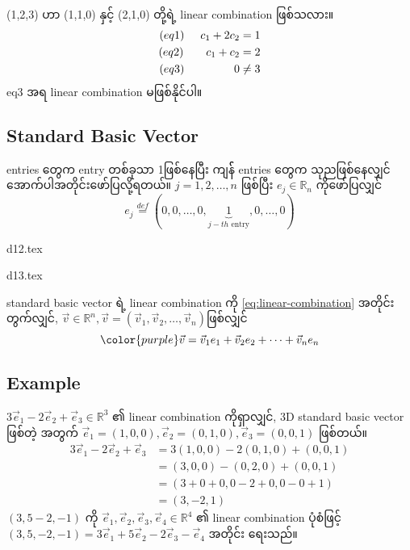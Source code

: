 (1,2,3) ဟာ (1,1,0) နှင့် (2,1,0) တို့ရဲ့ linear combination ဖြစ်သလား။
\[
    \begin{split}
        (eq1)\hspace{5mm}c_1+2c_2 & =1 \\
        (eq2)\hspace{7mm}c_1+c_2     & =2 \\
        (eq3)\hspace{15.5mm}0 & \neq3
    \end{split}
\]
eq3 အရ linear combination မဖြစ်နိုင်ပါ။
\subsection{Standard Basic Vector}
entries တွေက entry တစ်ခုသာ 1ဖြစ်နေပြီး ကျန်် entries တွေက သုညဖြစ်နေလျှင် အောက်ပါအတိုင်းဖော်ပြလို့ရတယ်။ $j=1,2,\dots,n$ ဖြစ်ပြီး $e_j\in\mathbb{R}_n$ ကိုဖော်ပြလျှင်
\begin{equation}
    e_j\stackrel{def}{=}(0,0,\dots,0,\underbrace{1}_{j-th\text{ entry}},0,\dots,0)
\end{equation}
\begin{minipage}{0.45\textwidth}
    \centering
    {d12.tex}
\end{minipage}
\hfill
\begin{minipage}{0.45\textwidth}
    \centering
    {d13.tex}
\end{minipage}

standard basic vector ရဲ့ linear combination ကို \ref{eq:linear-combination} အတိုင်းတွက်လျှင်, $\vec{v}\in\mathbb{R}^n, \vec{v}=(\vec{v}_1,\vec{v}_2,\dots,\vec{v}_n)$ဖြစ်လျှင်
\begin{equation}
    {\color{purple} \vec{v}=\vec{v}_1e_1+\vec{v}_2e_2+\dots+\vec{v}_ne_n}
\end{equation}

\subsection{Example}

$3\vec{e}_1-2\vec{e}_2+\vec{e}_3\in\mathbb{R}^3$ ၏ linear combination ကိုရှာလျှင်, 3D standard basic vector ဖြစ်တဲ့ အတွက် $\vec{e}_1=(1,0,0), \vec{e}_2=(0,1,0), \vec{e}_3=(0,0,1)$ ဖြစ်တယ်။
\[
    \begin{split}
        3\vec{e}_1-2\vec{e}_2+\vec{e}_3& =3(1,0,0)-2(0,1,0)+(0,0,1) \\
        &=(3,0,0)-(0,2,0)+(0,0,1) \\
        &=(3+0+0,0-2+0,0-0+1) \\
        &= (3,-2,1)
    \end{split}
\]
$(3,5-2,-1)$ ကို $\vec{e}_1,\vec{e}_2,\vec{e}_3,\vec{e}_4\in\mathbb{R}^4$ ၏ linear combination ပုံစံဖြင့် $(3,5,-2,-1)=3\vec{e}_1+5\vec{e}_2-2\vec{e}_3-\vec{e}_4$ အတိုင်း ရေးသည်။
